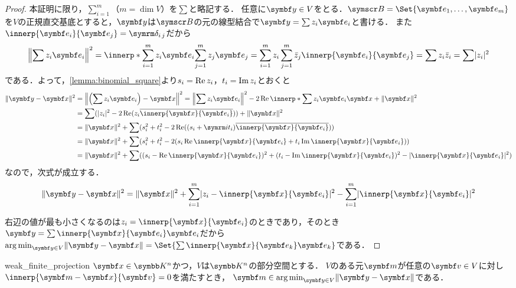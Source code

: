 \documentclass[../../main]{subfiles}
\begin{document}
\begin{proof}
  本証明に限り，\(\sum_{i=1}^m\)（\(m=\dim V\)）を\(\sum\)と略記する．
  任意に\(\vect{y}\in V\)をとる．\(\basis{B}=\Set{\vect{e}_1,\dots,\vect{e}_m}\)を\(V\)の正規直交基底とすると，\(\vect{y}\)は\(\basis{B}\)の元の線型結合で\(\vect{y}=\sum z_i\vect{e}_i\)と書ける．
  また\(\innerp{\vect{e}_i}{\vect{e}_j}=\kdelta{i}{j}\)だから
  \[
    \vnorm*{\sum z_i\vect{e}_i}^2 = \innerp*{\sum_{i=1}^mz_i\vect{e}_i}{\sum_{j=1}^mz_j\vect{e}_j}
    = \sum_{i=1}^mz_i\sum_{j=1}^m\conj{z}_j\innerp{\vect{e}_i}{\vect{e}_j}
    = \sum z_i\conj{z}_i
    = \sum\abs{z_i}^2
  \]
  である．よって，\cref{lemma:binomial_square}より\(s_i=\operatorname{Re} z_i\)，\(t_i=\operatorname{Im} z_i\)とおくと
  \begin{align*}
    \vnorm{\vect{y}-\vect{x}}^2 &= \vnorm*{\pqty*{\sum z_i\vect{e}_i}-\vect{x}}^2
    = \vnorm*{\sum z_i\vect{e}_i}^2-2\rpart\innerp*{\sum z_i\vect{e}_i}{\vect{x}}+\vnorm{\vect{x}}^2 \\
    &= \sum(\abs{z_i}^2-2\rpart(z_i\conj*{\innerp{\vect{x}}{\vect{e}_i}}))+\vnorm{\vect{x}}^2 \\
    &= \vnorm{\vect{x}}^2+\sum(s_i^2+t_i^2-2\rpart((s_i+\iuni t_i)\conj*{\innerp{\vect{x}}{\vect{e}_i}})) \\
    &= \vnorm{\vect{x}}^2+\sum(s_i^2+t_i^2-2(s_i\rpart\innerp{\vect{x}}{\vect{e}_i}+t_i\ipart\innerp{\vect{x}}{\vect{e}_i})) \\
    &= \vnorm{\vect{x}}^2+\sum((s_i-\rpart\innerp{\vect{x}}{\vect{e}_i})^2+(t_i-\ipart\innerp{\vect{x}}{\vect{e}_i})^2-\abs{\innerp{\vect{x}}{\vect{e}_i}}^2)
  \end{align*}
  なので，次式が成立する．
  \begin{equation}
    \label{equation:pre_bessels_inequality}
    \vnorm{\vect{y}-\vect{x}}^2 = \vnorm{\vect{x}}^2+\sum_{i=1}^m\abs{z_i-\innerp{\vect{x}}{\vect{e}_i}}^2-\sum_{i=1}^m\abs{\innerp{\vect{x}}{\vect{e}_i}}^2
  \end{equation}

  右辺の値が最も小さくなるのは\(z_i=\innerp{\vect{x}}{\vect{e}_i}\)のときであり，そのとき\(\vect{y}=\sum\innerp{\vect{x}}{\vect{e}_i}\vect{e}_i\)だから\(\argmin_{\vect{y}\in V}\vnorm{\vect{y}-\vect{x}}=\Set{\sum\innerp{\vect{x}}{\vect{e}_k}\vect{e}_k}\)である．
\end{proof}

\begin{proposition}{}{weak_finite_projection}
  \(\vect{x}\in\numset{K}^n\)かつ，\(V\)は\(\numset{K}^n\)の部分空間とする．
  \(V\)のある元\(\vect{m}\)が任意の\(\vect{v}\in V\)に対し\(\innerp{\vect{m}-\vect{x}}{\vect{v}}=0\)を満たすとき，
  \(\vect{m}\in\argmin_{\vect{y}\in V}\vnorm{\vect{y}-\vect{x}}\)である．
\end{proposition}
\end{document}
